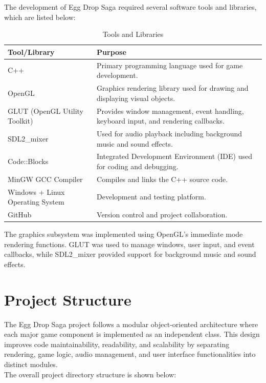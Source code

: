 \documentclass[12pt,a4paper]{report}
\begin{document}
The development of Egg Drop Saga required several software tools and libraries, which are listed below:

\begin{table}[!h]
\centering

\begin{tabular}{|p{4cm}|p{8cm}|}
\hline
\textbf{Tool/Library} & \textbf{Purpose} \\
\hline
C++ & Primary programming language used for game development. \\
\hline
OpenGL & Graphics rendering library used for drawing and displaying visual objects. \\
\hline
GLUT (OpenGL Utility Toolkit) & Provides window management, event handling, keyboard input, and rendering callbacks. \\
\hline
SDL2\_mixer & Used for audio playback including background music and sound effects. \\
\hline
Code::Blocks & Integrated Development Environment (IDE) used for coding and debugging. \\
\hline
MinGW GCC Compiler & Compiles and links the C++ source code. \\
\hline
Windows + Linux Operating System & Development and testing platform. \\
\hline
GitHub & Version control and project collaboration. \\
\hline
\end{tabular}
\caption{Tools and Libraries}
\end{table}


The graphics subsystem was implemented using OpenGL's immediate mode rendering functions. GLUT was used to manage windows, user input, and event callbacks, while SDL2\_mixer provided support for background music and sound effects.

\section{Project Structure}

The Egg Drop Saga project follows a modular object-oriented architecture where each major game component is implemented as an independent class. This design improves code maintainability, readability, and scalability by separating rendering, game logic, audio management, and user interface functionalities into distinct modules.\\

The overall project directory structure is shown below:
\end{document}
